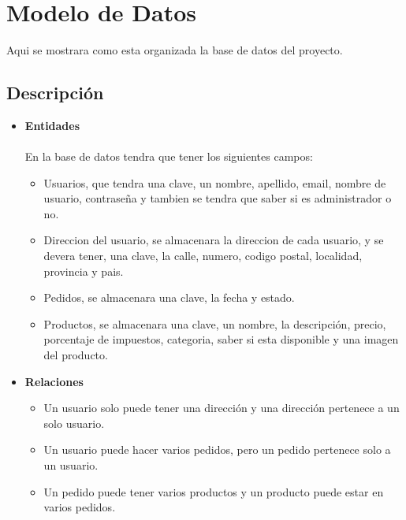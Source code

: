 \documentclass{article}
\begin{document}
\section{Modelo de Datos}
\quad Aqui se mostrara como esta organizada la base de datos del proyecto.
\subsection{Descripción}
\begin{itemize}
    \item \textbf{Entidades} \\\\
En la base de datos tendra que tener los siguientes campos:
\begin{itemize}
    \item Usuarios, que tendra una clave, un nombre, apellido, email, nombre de usuario, contraseña y tambien se tendra que saber si es administrador o no.
    \item Direccion del usuario, se almacenara la direccion de cada usuario, y se devera tener, una clave, la calle, numero, codigo postal, localidad, provincia y pais.
    \item Pedidos, se almacenara una clave, la fecha y estado. 
    \item Productos, se almacenara una clave, un nombre, la descripción, precio, porcentaje de impuestos, categoria, saber si esta disponible y una imagen del producto.
\end{itemize}
\item \textbf{Relaciones} 
\begin{itemize}
    \item Un usuario solo puede tener una dirección y una dirección pertenece a un solo usuario. 
    \item Un usuario puede hacer varios pedidos, pero un pedido pertenece solo a un usuario.
    \item Un pedido puede tener varios productos y un producto puede estar en varios pedidos.
\end{itemize}
\end{itemize}
\end{document}
